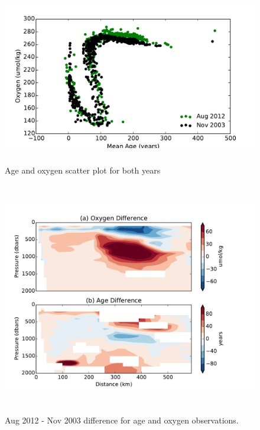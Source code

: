 \documentclass[11pt]{article}
\begin{document}
\begin{figure}[b!]
    \centering
    \includegraphics[height=3in]{age_oxygen_figure2.pdf}
    \caption{Age and oxygen scatter plot for both years}
\end{figure}

\begin{figure}[t!]
    \centering
    \includegraphics[height=4in]{age_oxygen_obs_difference.pdf}
    \caption{Aug 2012 - Nov 2003 difference for age and oxygen observations.}
\end{figure}
\end{document}
